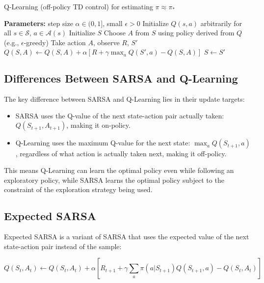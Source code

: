 \documentclass[11pt,a4paper]{article}
\begin{document}
\begin{algorithm}[H]
\caption{Q-Learning (off-policy TD control) for estimating $\pi \approx \pi_*$}
\begin{algorithmic}[1]
\State \textbf{Parameters:} step size $\alpha \in (0, 1]$, small $\epsilon > 0$
\State Initialize $Q(s, a)$ arbitrarily for all $s \in \mathcal{S}$, $a \in \mathcal{A}(s)$
    \State Initialize $S$
        \State Choose $A$ from $S$ using policy derived from $Q$ (e.g., $\epsilon$-greedy)
        \State Take action $A$, observe $R$, $S'$
        \State $Q(S, A) \leftarrow Q(S, A) + \alpha [R + \gamma \max_a Q(S', a) - Q(S, A)]$
        \State $S \leftarrow S'$
    \EndFor
\EndFor
\end{algorithmic}
\end{algorithm}

\subsection{Differences Between SARSA and Q-Learning}

The key difference between SARSA and Q-Learning lies in their update targets:

\begin{itemize}
    \item SARSA uses the Q-value of the next state-action pair actually taken: $Q(S_{t+1}, A_{t+1})$, making it on-policy.
    \item Q-Learning uses the maximum Q-value for the next state: $\max_a Q(S_{t+1}, a)$, regardless of what action is actually taken next, making it off-policy.
\end{itemize}

This means Q-Learning can learn the optimal policy even while following an exploratory policy, while SARSA learns the optimal policy subject to the constraint of the exploration strategy being used.

\subsection{Expected SARSA}

Expected SARSA is a variant of SARSA that uses the expected value of the next state-action pair instead of the sample:

\begin{equation}
Q(S_t, A_t) \leftarrow Q(S_t, A_t) + \alpha [R_{t+1} + \gamma \sum_a \pi(a|S_{t+1})Q(S_{t+1}, a) - Q(S_t, A_t)]
\end{equation}
\end{document}
